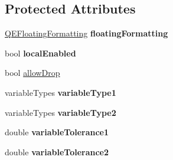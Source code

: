 \subsection*{Protected Attributes}
\begin{DoxyCompactItemize}
\item 
\hypertarget{classQEPeriodic_a68d825f1351f3ec32fdc666011f1d6a8}{
\hyperlink{classQEFloatingFormatting}{QEFloatingFormatting} {\bfseries floatingFormatting}}
\label{classQEPeriodic_a68d825f1351f3ec32fdc666011f1d6a8}

\item 
\hypertarget{classQEPeriodic_ae1490e5af7018e1550f5726b5dcb76f5}{
bool {\bfseries localEnabled}}
\label{classQEPeriodic_ae1490e5af7018e1550f5726b5dcb76f5}

\item 
bool \hyperlink{classQEPeriodic_aa97a78df2c379a27e3462d52d0e1ea93}{allowDrop}
\item 
\hypertarget{classQEPeriodic_a5f2bbabef3d81c771717f36bfafce28c}{
variableTypes {\bfseries variableType1}}
\label{classQEPeriodic_a5f2bbabef3d81c771717f36bfafce28c}

\item 
\hypertarget{classQEPeriodic_abd85d89d532f02d4856b3dd8af8986fb}{
variableTypes {\bfseries variableType2}}
\label{classQEPeriodic_abd85d89d532f02d4856b3dd8af8986fb}

\item 
\hypertarget{classQEPeriodic_acb8afc6c3da991799984e74ef162ee9d}{
double {\bfseries variableTolerance1}}
\label{classQEPeriodic_acb8afc6c3da991799984e74ef162ee9d}

\item 
\hypertarget{classQEPeriodic_a19eeeb07a8a81d768ea261e795d32ddf}{
double {\bfseries variableTolerance2}}
\label{classQEPeriodic_a19eeeb07a8a81d768ea261e795d32ddf}

\end{DoxyCompactItemize}
